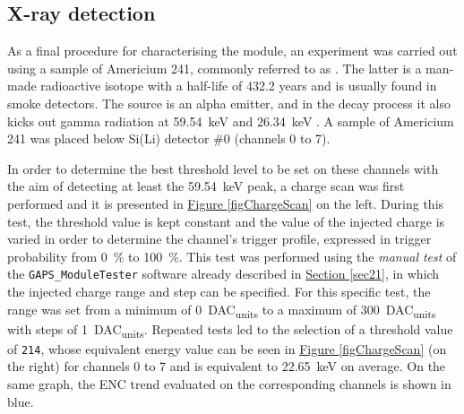 \subsection{X-ray detection}
\par
As a final procedure for characterising the module, an experiment was carried out using a sample of Americium 241, commonly referred to as .  The latter is a man-made radioactive isotope with a half-life of 432.2 years and is usually found in smoke detectors. The source is an alpha emitter, and in the decay process it also kicks out gamma radiation at \SI{59.54}{\kilo\electronvolt} and \SI{26.34}{\kilo\electronvolt} \cite{agencyfortoxicsubstancesanddiseaseregistry_2004_chemical}. A sample of Americium 241 was placed below Si(Li) detector \#0 (channels 0 to 7). 

\par
In order to determine the best threshold level to be set on these channels with the aim of detecting at least the \SI{59.54}{\kilo\electronvolt} peak, a charge scan was first performed and it is presented in \hyperref[figChargeScan]{Figure \ref{figChargeScan}} on the left. During this test, the threshold value is kept constant and the value of the injected charge is varied in order to determine the channel's trigger profile, expressed in trigger probability from \SI{0}{\percent} to \SI{100}{\percent}. This test was performed using the \textit{manual test} of the \texttt{GAPS\_ModuleTester} software already described in \hyperref[sec21]{Section \ref{sec21}}, in which the injected charge range and step can be specified. For this specific test, the range was set from a minimum of \SI{0}{DAC_{units}} to a maximum of \SI{300}{DAC_{units}} with steps of \SI{1}{DAC_{units}}. Repeated tests led to the selection of a threshold value of \texttt{214}, whose equivalent energy value can be seen in \hyperref[figChargeScan]{Figure \ref{figChargeScan}} (on the right) for channels 0 to 7 and is equivalent to \SI{22.65}{\kilo\electronvolt} on average. On the same graph, the ENC trend evaluated on the corresponding channels is shown in blue. 

